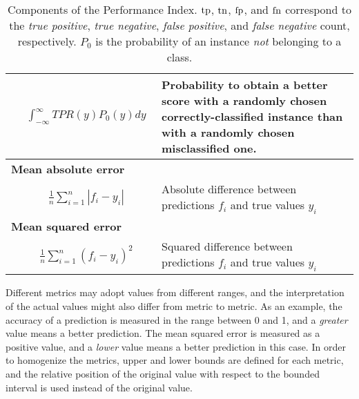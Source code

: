 \begin{table}[!ht]
\begin{tabularx}{\textwidth}{| l c X |}
			& $
				\begin{aligned}
					\int_{-\infty}^{\infty} TPR(y) P_0(y) dy
				\end{aligned}
			$ & Probability to obtain a better score with a randomly chosen correctly-classified
			instance than with a randomly chosen misclassified one.\\
			\hline
			\multicolumn{3}{|l|}{\bf Mean absolute error}\\
			& $
				\begin{aligned}
					\frac 1 n \sum_{i=1}^n |f_i - y_i|
				\end{aligned}
			$ & Absolute difference between predictions $f_i$ and true values $y_i$\\
			\hline
			\multicolumn{3}{|l|}{\bf Mean squared error}\\
			& $
				\begin{aligned}
					\frac 1 n \sum_{i=1}^n (f_i - y_i)^2
				\end{aligned}
			$ & Squared difference between predictions $f_i$ and true values $y_i$\\
			\hline
		\end{tabularx}
		\endgroup
		\caption[Components of the Performance Index]{Components of the Performance Index. $\mathrm{tp}$,
		$\mathrm{tn}$, $\mathrm{fp}$, and $\mathrm{fn}$ correspond to the \emph{true positive}, \emph{true negative},
		\emph{false positive}, and \emph{false negative} count, respectively. $P_0$ is the
		probability of an instance \emph{not} belonging to a class.}
		\label{tb:metrics}
	\end{table}

	Different metrics may adopt values from different ranges, and the interpretation of the
	actual values might also differ from metric to metric. As an example, the accuracy of a
	prediction is measured in the range between 0 and 1, and a \emph{greater} value means a better
	prediction. The mean squared error is measured as a positive value, and a \emph{lower} value means a
	better prediction in this case. In order to homogenize the metrics, upper and lower bounds are defined for
	each metric, and the relative position of the original value with respect to the bounded
	interval is used instead of the original value.

